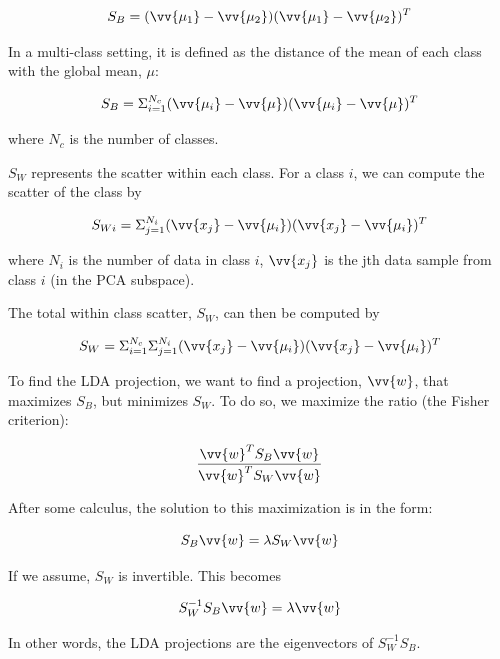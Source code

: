 \documentclass{article}
\begin{document}
\begin{equation}
    S_B = (\vv{\mu_1}-\vv{\mu_2})(\vv{\mu_1}-\vv{\mu_2})^T
\end{equation}

In a multi-class setting, it is defined as the distance of the mean of each class with the global mean, $\mu$:

\begin{equation}
    S_B = \Sigma_{i=1}^{N_c} (\vv{\mu_i}-\vv{\mu})(\vv{\mu_i}-\vv{\mu})^T
\end{equation}

where $N_c$ is the number of classes.

$S_W$ represents the scatter within each class. For a class $i$, we can compute the scatter of the class by

\begin{equation}
    S_{Wi} = \Sigma_{j=1}^{N_i} (\vv{x_j}-\vv{\mu_i})(\vv{x_j}-\vv{\mu_i})^T
\end{equation}

where $N_i$ is the number of data in class $i$, $\vv{x_j}$ is the jth data sample from class $i$ (in the PCA subspace). 

The total within class scatter, $S_W$, can then be computed by

\begin{equation}
    S_{W} = \Sigma_{i=1}^{N_c}\Sigma_{j=1}^{N_i} (\vv{x_j}-\vv{\mu_i})(\vv{x_j}-\vv{\mu_i})^T
\end{equation}

To find the LDA projection, we want to find a projection, $\vv{w}$, that maximizes $S_B$, but minimizes $S_W$. To do so, we maximize the ratio (the Fisher criterion):

\begin{equation}
\frac{\vv{w}^TS_B\vv{w}}{\vv{w}^TS_W\vv{w}}
\end{equation}

After some calculus, the solution to this maximization is in the form:

\begin{equation}
    S_B\vv{w} = \lambda S_W \vv{w}
\end{equation}

If we assume, $S_W$ is invertible. This becomes

\begin{equation}
    S_W^{-1}S_B\vv{w} = \lambda \vv{w}
\end{equation}

In other words, the LDA projections are the eigenvectors of $S_W^{-1}S_B$. 
\end{document}

